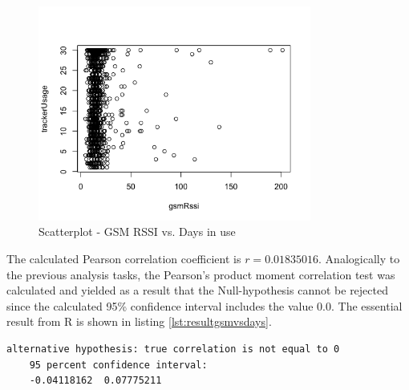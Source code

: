 \begin{enumerate}
	\begin{figure}
		\centering
		\includegraphics[width=0.8\textwidth]{img/gsmRssiVsTrackerUsagePlot.png}
		\caption{Scatterplot - GSM RSSI vs. Days in use}
		\label{fig:gsmRssiVsDaysInUse}
	\end{figure} 
	
	The calculated Pearson correlation coefficient is $r = 0.01835016$. 
	Analogically to the previous analysis tasks, the Pearson's product moment correlation test was calculated and yielded as a result that the Null-hypothesis cannot be rejected since the calculated 95\% confidence interval includes the value $0.0$. The essential result from R is shown in listing \ref{lst:resultgsmvsdays}.
	
	\begin{lstlisting}[caption={Result from Pearson's product moment correlation test}, label={lst:resultgsmvsdays}]
	alternative hypothesis: true correlation is not equal to 0
	95 percent confidence interval:
	-0.04118162  0.07775211
	\end{lstlisting}
	
\end{enumerate}

